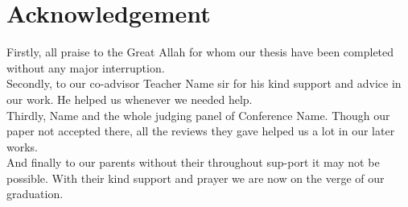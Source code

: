\section*{Acknowledgement}
Firstly, all praise to the Great Allah for whom our thesis have been completed without any major interruption.\\
Secondly, to our co-advisor Teacher Name sir for his kind support and advice in our work. He helped us whenever we needed help.\\
Thirdly, Name and the whole judging panel of Conference Name. Though our paper not accepted there, all the reviews they gave helped us a lot in our later works.\\
And finally to our parents without their throughout sup-port it may not be possible. With their kind support and prayer we are now on the verge of our graduation.